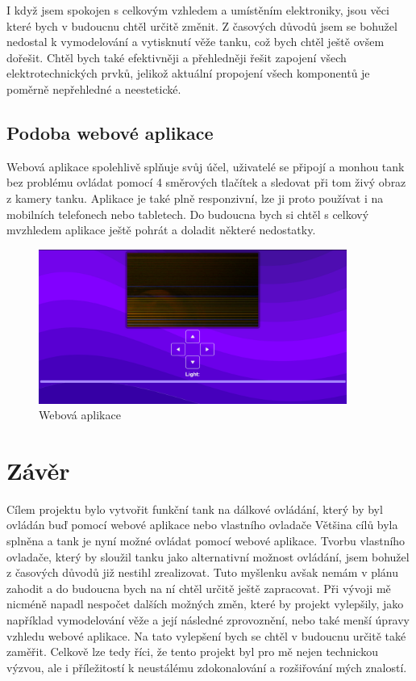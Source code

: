 \documentclass[12pt, a4paper,
oneside
openany
]{report}
\begin{document}
\newpage
\noindent I když jsem spokojen s celkovým vzhledem a umístěním elektroniky, jsou věci které bych v budoucnu chtěl určitě změnit. Z časových důvodů jsem se bohužel nedostal k vymodelování a vytisknutí věže tanku, což bych chtěl ještě ovšem dořešit. Chtěl bych také efektivněji a přehledněji řešit zapojení všech elektrotechnických prvků, jelikož aktuální propojení všech komponentů je poměrně nepřehledné a neestetické. 

    
    \section{Podoba webové aplikace}
    
    Webová aplikace spolehlivě splňuje svůj účel, uživatelé se připojí a monhou tank bez problému ovládat pomocí 4 směrových tlačítek a sledovat při tom živý obraz z kamery tanku. Aplikace je také plně responzivní, lze ji proto používat i na mobilních telefonech nebo tabletech. Do budoucna bych si chtěl s celkový mvzhledem aplikace ještě pohrát a doladit některé nedostatky.
\vspace*{0.05\textheight}
	\begin{figure}[h]
		\centering 
		\includegraphics[width=0.9\textwidth]{image/server.png} %
		\caption{Webová aplikace} 
	\end{figure}

 
	\chapter*{Závěr}
	
Cílem projektu bylo vytvořit funkční tank na dálkové ovládání, který by byl ovládán buď pomocí webové aplikace nebo vlastního ovladače Většina cílů byla splněna a tank je nyní možné ovládat pomocí webové aplikace. Tvorbu vlastního ovladače, který by sloužil tanku jako alternativní možnost ovládání, jsem bohužel z časových důvodů již nestihl zrealizovat. Tuto myšlenku avšak nemám v plánu zahodit a do budoucna bych na ní chtěl určitě ještě zapracovat. Při vývoji mě nicméně napadl nespočet dalších možných změn, které by projekt vylepšily, jako například vymodelování věže a její následné zprovoznění, nebo také menší úpravy vzhledu webové aplikace. Na tato vylepšení bych se chtěl v budoucnu určitě také zaměřit. Celkově lze tedy říci, že tento projekt byl pro mě nejen technickou výzvou, ale i příležitostí k neustálému zdokonalování a rozšiřování mých znalostí.
\end{document}
